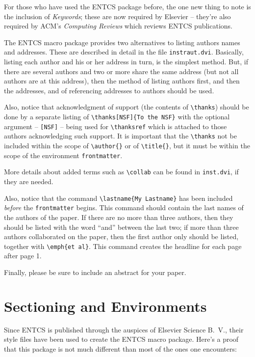 \documentclass{entcs} \usepackage{entcsmacro}
\def\lastname{Please list Your Lastname Here}
\begin{document}
For those who have used the ENTCS package before, the one new thing to
note is the inclusion of \emph{Keywords}; these are now required by
Elsevier -- they're also required by ACM's \emph{Computing Reviews}
which reviews ENTCS publications.

The ENTCS macro package provides two alternatives to listing authors
names and addresses.  These are described in detail in the file
\texttt{instraut.dvi}. Basically, listing each author and his or her
address in turn, is the simplest method.  But, if there are several
authors and two or more share the same address (but not all authors
are at this address), then the method of listing authors first, and
then the addresses, and of referencing addresses to authors should be
used.

Also, notice that acknowledgment of support (the contents of
\verb+\thanks+) should be done by a separate listing of
\verb+\thanks[NSF]{To the NSF}+ with the optional argument --
\verb+[NSF]+ -- being used for \verb+\thanksref+ which is attached to
those authors acknowledging such support.  It is important that the
\verb+\thanks+ not be included within the scope of \verb+\author{}+ or
of \verb+\title{}+, but it must be within the scope of the environment
\texttt{frontmatter}.

More details about added terms such as \verb+\collab+ can be
found in \texttt{inst.dvi}, if they are needed.

Also, notice that the command \verb+\lastname{My Lastname}+ has been
included \emph{before} the \texttt{frontmatter} begins.  This command
should contain the last names of the authors of the paper.  If there
are no more than three authors, then they should be listed with the
word ``and'' between the last two; if more than three authors
collaborated on the paper, then the first author only should be
listed, together with \verb+\emph{et al}+.  This command creates the
headline for each page after page 1.

Finally, please be sure to include an abstract for your paper.

\section{Sectioning and Environments}
Since ENTCS is published through the auspices of Elsevier Science
B.~V., their style files have been used to create the ENTCS macro
package.  Here's a proof that this package is not much different than
most of the ones one encounters:
\end{document}
